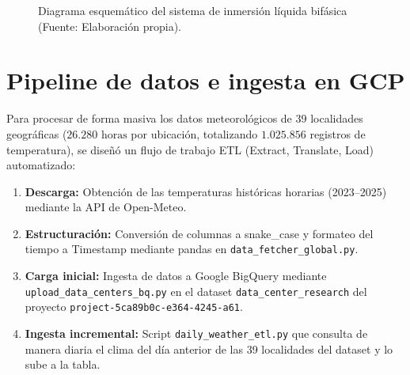 \begin{figure}[htbp]
\centering
{}
\caption{Diagrama esquem\'atico del sistema de inmersi\'on l\'iquida bif\'asica (Fuente: Elaboraci\'on propia).}
\label{fig:immersion_diagram}
\end{figure}


\section{Pipeline de datos e ingesta en GCP}\label{sec:pipeline_gcp}
Para procesar de forma masiva los datos meteorol\'ogicos de 39 localidades geogr\'aficas ($26.280\text{ horas}$ por ubicaci\'on, totalizando $1.025.856$ registros de temperatura), se dise\~n\'o \cite{masnet2020} un flujo de trabajo ETL (Extract, Translate, Load) automatizado:
\begin{enumerate}
    \item \textbf{Descarga:} Obtenci\'on de las temperaturas hist\'oricas horarias (2023--2025) mediante la API de Open-Meteo.
    \item \textbf{Estructuraci\'on:} Conversi\'on de columnas a snake\_case y formateo del tiempo a Timestamp mediante pandas en \texttt{data\_fetcher\_global.py}.
    \item \textbf{Carga inicial:} Ingesta de datos a Google BigQuery mediante \texttt{upload\_data\_centers\_bq.py} en el dataset \texttt{data\_center\_research} del proyecto \texttt{project-5ca89b0c-e364-4245-a61}.
    \item \textbf{Ingesta incremental:} Script \texttt{daily\_weather\_etl.py} que consulta de manera diaria el clima del d\'ia anterior de las 39 localidades del dataset y lo sube a la tabla.
\end{enumerate}

